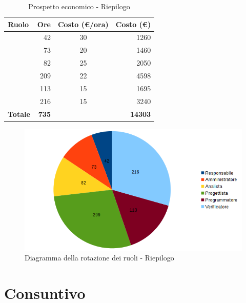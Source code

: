 \documentclass[12pt,a4paper]{article}
\begin{document}
\begin{table}[H]
	\begin{center}
		\begin{tabular}{l r c r}
			\toprule
			\textbf{Ruolo}	& \textbf{Ore} & \textbf{Costo (\euro/ora)}	& \textbf{Costo (\euro)} \\ \midrule
			\midrule
			\RE & 42 & 30 & 1260 \\ \midrule
			\AM & 73 & 20 & 1460 \\ \midrule
			\AN & 82 & 25 & 2050 \\ \midrule
			\PG & 209 & 22 & 4598 \\ \midrule
			\PR & 113 & 15 & 1695 \\ \midrule
			\VR & 216 & 15 & 3240 \\ \midrule
			\textbf{Totale} & \textbf{735} &  & \textbf{14303} \\
			\bottomrule
		\end{tabular}
		\caption{Prospetto economico - Riepilogo}
	\end{center}
\end{table}

\begin{center}
	\begin{figure}[H]
		\centering \includegraphics[width=\textwidth]{diagrammaTortaRiepilogoTotaleOre.png}
		\caption{Diagramma della rotazione dei ruoli - Riepilogo}
	\end{figure}
\end{center}

\newpage

\section{Consuntivo}

\newpage
\end{document}
